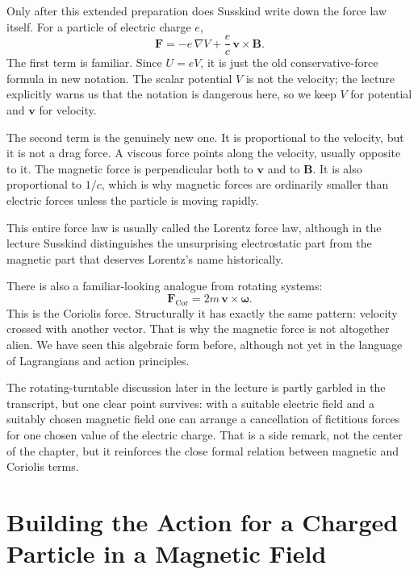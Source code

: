 Only after this extended preparation does Susskind write down the force law itself. For a particle of electric charge \(e\),
\begin{equation}
\mathbf F=-e\,\nabla V+\frac{e}{c}\,\mathbf v\times \mathbf B.
\end{equation}
The first term is familiar. Since \(U=eV\), it is just the old conservative-force formula in new notation. The scalar potential \(V\) is not the velocity; the lecture explicitly warns us that the notation is dangerous here, so we keep \(V\) for potential and \(\mathbf v\) for velocity.

The second term is the genuinely new one. It is proportional to the velocity, but it is not a drag force. A viscous force points along the velocity, usually opposite to it. The magnetic force is perpendicular both to \(\mathbf v\) and to \(\mathbf B\). It is also proportional to \(1/c\), which is why magnetic forces are ordinarily smaller than electric forces unless the particle is moving rapidly.

This entire force law is usually called the Lorentz force law, although in the lecture Susskind distinguishes the unsurprising electrostatic part from the magnetic part that deserves Lorentz's name historically.

There is also a familiar-looking analogue from rotating systems:
\begin{equation}
\mathbf F_{\mathrm{Cor}}=2m\,\mathbf v\times \boldsymbol\omega.
\end{equation}
This is the Coriolis force. Structurally it has exactly the same pattern: velocity crossed with another vector. That is why the magnetic force is not altogether alien. We have seen this algebraic form before, although not yet in the language of Lagrangians and action principles.

The rotating-turntable discussion later in the lecture is partly garbled in the transcript, but one clear point survives: with a suitable electric field and a suitably chosen magnetic field one can arrange a cancellation of fictitious forces for one chosen value of the electric charge. That is a side remark, not the center of the chapter, but it reinforces the close formal relation between magnetic and Coriolis terms.

\section{Building the Action for a Charged Particle in a Magnetic Field}

